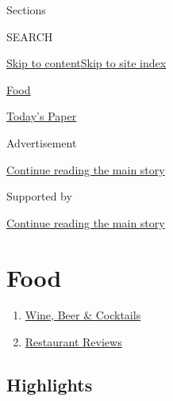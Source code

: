 Sections

SEARCH

\protect\hyperlink{site-content}{Skip to
content}\protect\hyperlink{site-index}{Skip to site index}

\href{https://www.nytimes.com/section/food}{Food}

\href{https://myaccount.nytimes.com/auth/login?response_type=cookie\&client_id=vi}{}

\href{https://www.nytimes.com/section/todayspaper}{Today's Paper}

Advertisement

\protect\hyperlink{after-top}{Continue reading the main story}

Supported by

\protect\hyperlink{after-sponsor}{Continue reading the main story}

\hypertarget{food}{%
\section{Food}\label{food}}

\begin{enumerate}
\def\labelenumi{\arabic{enumi}.}
\tightlist
\item
  \href{/section/food/drinks}{Wine, Beer \& Cocktails}
\item
  \href{/reviews/dining}{Restaurant Reviews}
\end{enumerate}

\hypertarget{highlights}{%
\subsection{Highlights}\label{highlights}}

